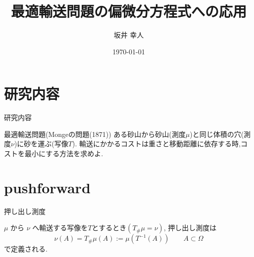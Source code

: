 \documentclass[dvipdfmx, 12pt]{beamer}
\title{最適輸送問題の偏微分方程式への応用}
\author[坂井 幸人]{坂井 幸人}
\institute[数物科学専攻 1年]{数物科学専攻 1年}
\date{\today}
\begin{document}
\frame{\maketitle}


\begin{comment}
\begin{frame}{目次}
    \tableofcontents
\end{frame}
\end{comment}


\section{研究内容}
\begin{frame}{研究内容}
    \begin{block}{最適輸送問題(Mongeの問題(1871))}
        ある砂山から砂山(測度$\mu$)と同じ体積の穴(測度$\nu$)に砂を運ぶ(写像$T$).
        輸送にかかるコストは重さと移動距離に依存する時,コストを最小にする方法を求めよ.
    \end{block}
\end{frame}

\section{pushforward}
\begin{frame}{押し出し測度}
    
    \begin{definition}
        $\mu$ から $\nu$ へ輸送する写像を$T$とするとき$(T_\#\mu = \nu)$,
        押し出し測度は
        \begin{equation*}
            \nu (A) =  T_\#\mu (A) := \mu (T^{-1} (A)) \qquad A \subset \Omega
        \end{equation*}
        で定義される.
    \end{definition}
\end{frame}



\begin{comment}
\end{comment}




\end{document}
